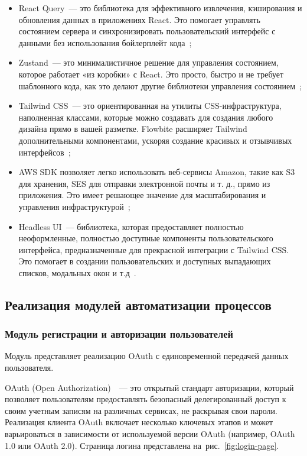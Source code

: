 \begin{itemize}[wide=0pt]
	\item React Query~--- это библиотека для эффективного извлечения, кэширования и обновления данных в приложениях React. Это помогает управлять состоянием сервера и синхронизировать пользовательский интерфейс с данными без использования бойлерплейт кода~\cite{bib:reactquery};
	
	\item Zustand~--- это минималистичное решение для управления состоянием, которое работает «из коробки» с React. Это просто, быстро и не требует шаблонного кода, как это делают другие библиотеки управления состоянием~\cite{bib:zustand};
	
	\item Tailwind CSS~--- это ориентированная на утилиты CSS-инфраструктура, наполненная классами, которые можно создавать для создания любого дизайна прямо в вашей разметке. Flowbite расширяет Tailwind дополнительными компонентами, ускоряя создание красивых и отзывчивых интерфейсов~\cite{bib:tailwind};
	
	\item AWS SDK позволяет легко использовать веб-сервисы Amazon, такие как S3 для хранения, SES для отправки электронной почты и т. д., прямо из приложения. Это имеет решающее значение для масштабирования и управления инфраструктурой~\cite{bib:awssdk};
	
	\item Headless UI~--- библиотека, которая предоставляет полностью неоформленные, полностью доступные компоненты пользовательского интерфейса, предназначенные для прекрасной интеграции с Tailwind CSS. Это помогает в создании пользовательских и доступных выпадающих списков, модальных окон и т.д~\cite{bib:headlessui}.
\end{itemize}

\subsection{Реализация модулей автоматизации процессов}

\subsubsection{Модуль регистрации и авторизации пользователей}

Модуль представляет реализацию OAuth с единовременной передачей данных пользователя.

OAuth (Open Authorization)~\cite{bib:oauth2}~--- это открытый стандарт авторизации, который позволяет пользователям предоставлять безопасный делегированный доступ к своим учетным записям на различных сервисах, не раскрывая свои пароли. Реализация клиента OAuth включает несколько ключевых этапов и может варьироваться в зависимости от используемой версии OAuth (например, OAuth 1.0 или OAuth 2.0). Страница логина представлена на~рис.~\ref{fig:login-page}.

